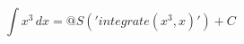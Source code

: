 \documentclass{article}
\begin{document}
$$\int x^3\,dx = @{S('integrate(x^3,x)')}+C$$
\end{document}
